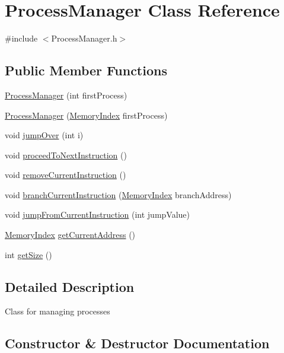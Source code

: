 \hypertarget{classProcessManager}{}\section{Process\+Manager Class Reference}
\label{classProcessManager}


{\ttfamily \#include $<$Process\+Manager.\+h$>$}

\subsection*{Public Member Functions}
\begin{DoxyCompactItemize}
\item 
\hyperlink{classProcessManager_ae180ab47bde18fe2879a8d7473c1a80c}{Process\+Manager} (int first\+Process)
\item 
\hyperlink{classProcessManager_ab8b145c5552462cbeb1b81cf085ac694}{Process\+Manager} (\hyperlink{classMemoryIndex}{Memory\+Index} first\+Process)
\item 
void \hyperlink{classProcessManager_a3a526dfc1413064125c163e58411070d}{jump\+Over} (int i)
\item 
void \hyperlink{classProcessManager_ad1050286f389fc52063ac4fb29fa8020}{proceed\+To\+Next\+Instruction} ()
\item 
void \hyperlink{classProcessManager_a7e9a444c31df1147142843da620ffecd}{remove\+Current\+Instruction} ()
\item 
void \hyperlink{classProcessManager_ac2cbf900825382675f11911098fa0f66}{branch\+Current\+Instruction} (\hyperlink{classMemoryIndex}{Memory\+Index} branch\+Address)
\item 
void \hyperlink{classProcessManager_a2aaeb45b6e1a58e86856899d925c2c7f}{jump\+From\+Current\+Instruction} (int jump\+Value)
\item 
\hyperlink{classMemoryIndex}{Memory\+Index} \hyperlink{classProcessManager_abfb4edde7c0650b0bfc457a5be28d514}{get\+Current\+Address} ()
\item 
int \hyperlink{classProcessManager_a20de7626ee3409fb05c0b53a32697bae}{get\+Size} ()
\end{DoxyCompactItemize}


\subsection{Detailed Description}
Class for managing processes 

\subsection{Constructor \& Destructor Documentation}
\mbox{\label{classProcessManager_ae180ab47bde18fe2879a8d7473c1a80c}} 
